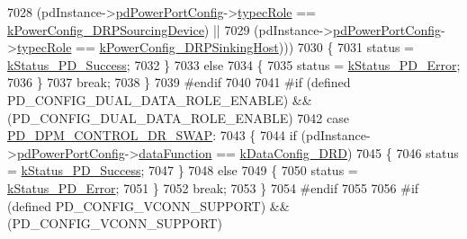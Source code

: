 \begin{DoxyCode}
7028                  (pdInstance->\hyperlink{struct__pd__instance_aa7854ddf70e64f92b178cc5d787037a2}{pdPowerPortConfig}->\hyperlink{struct__pd__power__port__config_a649079672f270a65578bd41e0e624e16}{typecRole} == 
      \hyperlink{group__usb__pd__stack_ggaffef947540aace08ecf6fd25f69720a9a2669bea019494464b15f2a4e4904d385}{kPowerConfig\_DRPSourcingDevice}) ||
7029                  (pdInstance->\hyperlink{struct__pd__instance_aa7854ddf70e64f92b178cc5d787037a2}{pdPowerPortConfig}->\hyperlink{struct__pd__power__port__config_a649079672f270a65578bd41e0e624e16}{typecRole} == 
      \hyperlink{group__usb__pd__stack_ggaffef947540aace08ecf6fd25f69720a9aba8782be77976d2ffc9830f1106e80f3}{kPowerConfig\_DRPSinkingHost})))
7030             \{
7031                 status = \hyperlink{group__usb__pd__stack_ggaaad4cd00dd02567c6169429e3a895073acf06f954f9c52f560cea34df48c63555}{kStatus\_PD\_Success};
7032             \}
7033             \textcolor{keywordflow}{else}
7034             \{
7035                 status = \hyperlink{group__usb__pd__stack_ggaaad4cd00dd02567c6169429e3a895073a4d58370b8ee8d3d2a4c477f7a3f84dda}{kStatus\_PD\_Error};
7036             \}
7037             \textcolor{keywordflow}{break};
7038         \}
7039 \textcolor{preprocessor}{#endif
}
7040 \textcolor{preprocessor}{}
7041 \textcolor{preprocessor}{#if (defined PD\_CONFIG\_DUAL\_DATA\_ROLE\_ENABLE) && (PD\_CONFIG\_DUAL\_DATA\_ROLE\_ENABLE)
}
7042 \textcolor{preprocessor}{}        \textcolor{keywordflow}{case} \hyperlink{group__usb__pd__stack_ggabf2676c3360b7c572954ae09c0a5e46aa7baf188a71537ab45cc32ff871765ef0}{PD\_DPM\_CONTROL\_DR\_SWAP}:
7043         \{
7044             \textcolor{keywordflow}{if} (pdInstance->\hyperlink{struct__pd__instance_aa7854ddf70e64f92b178cc5d787037a2}{pdPowerPortConfig}->\hyperlink{struct__pd__power__port__config_a5a3c023210ceec3faac6d13b0de58f75}{dataFunction} == 
      \hyperlink{group__usb__pd__stack_ggacc3677fc21b76efa77ae5f744194394aafe1a15a0a49245fe0d1a94e5ab062202}{kDataConfig\_DRD})
7045             \{
7046                 status = \hyperlink{group__usb__pd__stack_ggaaad4cd00dd02567c6169429e3a895073acf06f954f9c52f560cea34df48c63555}{kStatus\_PD\_Success};
7047             \}
7048             \textcolor{keywordflow}{else}
7049             \{
7050                 status = \hyperlink{group__usb__pd__stack_ggaaad4cd00dd02567c6169429e3a895073a4d58370b8ee8d3d2a4c477f7a3f84dda}{kStatus\_PD\_Error};
7051             \}
7052             \textcolor{keywordflow}{break};
7053         \}
7054 \textcolor{preprocessor}{#endif
}
7055 \textcolor{preprocessor}{}
7056 \textcolor{preprocessor}{#if (defined PD\_CONFIG\_VCONN\_SUPPORT) && (PD\_CONFIG\_VCONN\_SUPPORT)
}
\end{DoxyCode}
